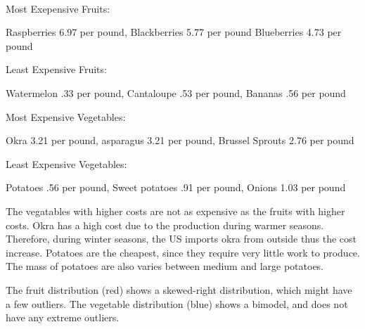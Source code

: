 \documentclass[11pt]{article}
\begin{document}
    \begin{center}
    \end{center}
    { \hspace*{\fill} \\}
    
    Most Exepensive Fruits:

Raspberries 6.97 per pound, Blackberries 5.77 per pound Blueberries 4.73
per pound

Least Expensive Fruits:

Watermelon .33 per pound, Cantaloupe .53 per pound, Bananas .56 per
pound

Most Expensive Vegetables:

Okra 3.21 per pound, asparagus 3.21 per pound, Brussel Sprouts 2.76 per
pound

Least Expensive Vegetables:

Potatoes .56 per pound, Sweet potatoes .91 per pound, Onions 1.03 per
pound

The vegatables with higher costs are not as expensive as the fruits with
higher costs. Okra has a high cost due to the production during warmer
seasons. Therefore, during winter seasons, the US imports okra from
outside thus the cost increase. Potatoes are the cheapest, since they
require very little work to produce. The mass of potatoes are also
varies between medium and large potatoes.

The fruit distribution (red) shows a skewed-right distribution, which
might have a few outliers. The vegetable distribution (blue) shows a
bimodel, and does not have any extreme outliers.
\end{document}
